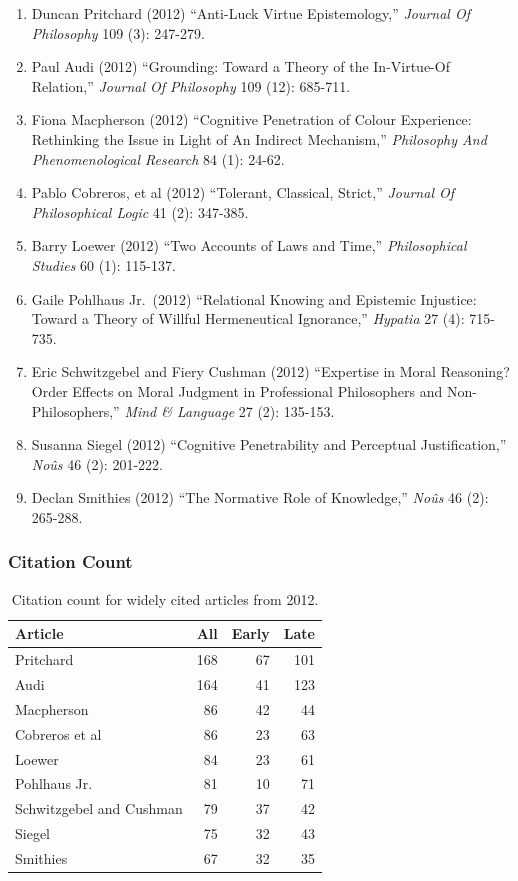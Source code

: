 \documentclass[
  10pt,
  letterpaper,
  DIV=11,
  numbers=noendperiod,
  twoside]{scrartcl}
\providecommand{\tightlist}{%
  \setlength{\itemsep}{0pt}\setlength{\parskip}{0pt}}\usepackage{longtable,booktabs,array}
\begin{document}
\begin{enumerate}
\def\labelenumi{\arabic{enumi}.}
\tightlist
\item
  Duncan Pritchard (2012) ``Anti-Luck Virtue Epistemology,''
  \emph{Journal Of Philosophy} 109 (3): 247-279.
\item
  Paul Audi (2012) ``Grounding: Toward a Theory of the In-Virtue-Of
  Relation,'' \emph{Journal Of Philosophy} 109 (12): 685-711.
\item
  Fiona Macpherson (2012) ``Cognitive Penetration of Colour Experience:
  Rethinking the Issue in Light of An Indirect Mechanism,''
  \emph{Philosophy And Phenomenological Research} 84 (1): 24-62.
\item
  Pablo Cobreros, et al (2012) ``Tolerant, Classical, Strict,''
  \emph{Journal Of Philosophical Logic} 41 (2): 347-385.
\item
  Barry Loewer (2012) ``Two Accounts of Laws and Time,''
  \emph{Philosophical Studies} 60 (1): 115-137.
\item
  Gaile Pohlhaus Jr.~(2012) ``Relational Knowing and Epistemic
  Injustice: Toward a Theory of Willful Hermeneutical Ignorance,''
  \emph{Hypatia} 27 (4): 715-735.
\item
  Eric Schwitzgebel and Fiery Cushman (2012) ``Expertise in Moral
  Reasoning? Order Effects on Moral Judgment in Professional
  Philosophers and Non-Philosophers,'' \emph{Mind \& Language} 27 (2):
  135-153.
\item
  Susanna Siegel (2012) ``Cognitive Penetrability and Perceptual
  Justification,'' \emph{Noûs} 46 (2): 201-222.
\item
  Declan Smithies (2012) ``The Normative Role of Knowledge,''
  \emph{Noûs} 46 (2): 265-288.
\end{enumerate}

\subsubsection*{Citation Count}\label{sec-count-2012}

\begin{longtable}[]{@{}lrrr@{}}

\caption{\label{tbl-citation-count-2012}Citation count for widely cited
articles from 2012.}

\tabularnewline

\toprule\noalign{}
Article & All & Early & Late \\
\midrule\noalign{}
\endhead
\bottomrule\noalign{}
\endlastfoot
Pritchard & 168 & 67 & 101 \\
Audi & 164 & 41 & 123 \\
Macpherson & 86 & 42 & 44 \\
Cobreros et al & 86 & 23 & 63 \\
Loewer & 84 & 23 & 61 \\
Pohlhaus Jr. & 81 & 10 & 71 \\
Schwitzgebel and Cushman & 79 & 37 & 42 \\
Siegel & 75 & 32 & 43 \\
Smithies & 67 & 32 & 35 \\

\end{longtable}
\end{document}

